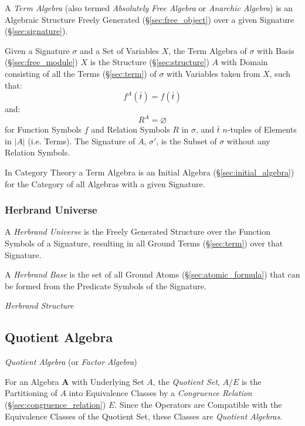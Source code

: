 A \emph{Term Algebra} (also termed \emph{Absolutely Free Algebra} or
\emph{Anarchic Algebra}) is an Algebraic Structure Freely Generated
(\S\ref{sec:free_object}) over a given Signature
(\S\ref{sec:signature}).

Given a Signature $\sigma$ and a Set of Variables $X$, the Term
Algebra of $\sigma$ with Basis (\S\ref{sec:free_module}) $X$ is the
Structure (\S\ref{sec:structure}) $A$ with Domain consisting of all
the Terms (\S\ref{sec:term}) of $\sigma$ with Variables taken from
$X$, such that:
\[
  f^A(\bar{t}) = f(\bar{t})
\] and: \[
  R^A = \varnothing
\]
for Function Symbols $f$ and Relation Symbols $R$ in $\sigma$, and
$\bar{t}$ $n$-tuples of Elements in $|A|$ (i.e. Terms). The Signature
of $A$, $\sigma'$, is the Subset of $\sigma$ without any Relation
Symbols.

In Category Theory a Term Algebra is an Initial Algebra
(\S\ref{sec:initial_algebra}) for the Category of all Algebras with a
given Signature.



\subsubsection{Herbrand Universe}\label{sec:herbrand_universe}

A \emph{Herbrand Universe} is the Freely Generated Structure over the
Function Symbols of a Signature, resulting in all Ground Terms
(\S\ref{sec:term}) over that Signature.

A \emph{Herbrand Base} is the set of all Ground Atoms
(\S\ref{sec:atomic_formula}) that can be formed from the Predicate
Symbols of the Signature.

\emph{Herbrand Structure}



\subsection{Quotient Algebra}\label{sec:quotient_algebra}

\emph{Quotient Algebra} (or \emph{Factor Algebra})

For an Algebra $\mathbf{A}$ with Underlying Set $A$, the
\emph{Quotient Set}, $A / E$ is the Partitioning of $A$ into
Equivalence Classes by a \emph{Congruence Relation}
(\S\ref{sec:congruence_relation}) $E$. Since the Operators are
Compatible with the Equivalence Classes of the Quotient Set, these
Classes are \emph{Quotient Algebras}.




